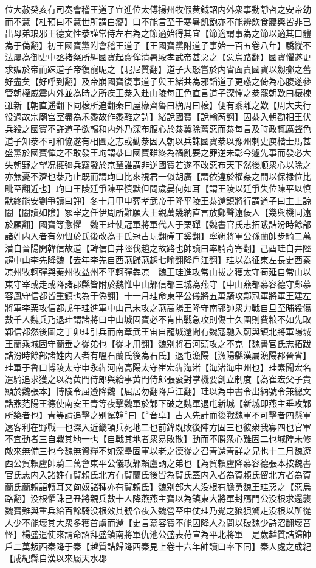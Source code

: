 位大赦癸亥有司奏會稽王道子宜進位太傅揚州牧假黄鉞詔内外衆事動靜咨之安帝幼而不慧【杜預曰不慧世所謂白癡】口不能言至于寒暑飢飽亦不能辨飲食寢興皆非已出母弟琅邪王德文性㳟謹常侍左右為之節適始得其宜【節適謂事為之節以適其口體為于偽翻】初王國寶黨附會稽王道子【王國寶黨附道子事始一百五卷八年】驕縱不法屢為御史中丞褚粲所糾國寶起齋侔清暑殿孝武帝甚惡之【惡烏路翻】國寶懼遂更求媚於帝而踈道子帝復寵昵之【昵尼質翻】道子大怒嘗於内省面責國寶以劔擲之舊好盡矣【好呼到翻】及帝崩國寶復事道子與王緒共為邪謟道子更惑之倚為心腹遂參管朝權威震内外並為時之所疾王㳟入赴山陵每正色直言道子深憚之㳟罷朝歎曰榱棟雖新【朝直遥翻下同榱所追翻秦曰屋椽齊魯曰桷周曰榱】便有黍離之歎【周大夫行役過故宗廟宫室盡為禾黍故作黍離之詩】緒說國寶【說輸芮翻】因㳟入朝勸相王伏兵殺之國寶不許道子欲輯和内外乃深布腹心於㳟冀除舊惡而㳟每言及時政輒厲聲色道子知㳟不可和恊遂有相圖之志或勸㳟因入朝以兵誅國寶㳟以豫州刺史庾楷士馬甚盛黨於國寶憚之不敢發王珣謂㳟曰國寶雖終為禍亂要之罪逆未彰今遽先事而發必大失朝野之望况擁彊兵竊發於京輦誰謂非逆國寶若遂不改惡布天下然後順衆心以除之亦無憂不濟也㳟乃止既而謂珣曰比來視君一似胡廣【謂依違於權姦之間以保禄位比毗至翻近也】珣曰王陵廷爭陳平慎默但問歲晏何如耳【謂王陵以廷爭失位陳平以慎默終能安劉爭讀曰諍】冬十月甲申葬孝武帝于隆平陵王㳟還鎮將行謂道子曰主上諒闇【闇讀如隂】冢宰之任伊周所難願大王親萬幾納直言放鄭聲遠佞人【幾與機同遠於願翻】國寶等愈懼　魏王珪使冠軍將軍代人于栗磾【魏書官氏志拓跋詰汾時餘部諸姓内入者有勿忸於氏後改為于氏冠古玩翻磾丁奚翻】寧朔將軍公孫蘭帥步騎二萬潜自晉陽開韓信故道【韓信自井陘伐趙之故路也帥讀曰率騎奇寄翻】己酉珪自井陘趨中山李先降魏【去年李先自西燕歸燕趨七喻翻降戶江翻】珪以為征東左長史西秦凉州牧軻彈與秦州牧益州不平軻彈犇凉　魏王珪進攻常山拔之獲太守苟延自常山以東守宰或走或降諸郡縣皆附於魏惟中山鄴信都三城為燕守【中山燕都慕容德守鄴慕容鳳守信都皆重鎮也為于偽翻】十一月珪命東平公儀將五萬騎攻鄴冠軍將軍王建左將軍李栗攻信都戊午珪進軍中山己未攻之燕高陽王隆守南郭帥衆力戰自旦至晡殺傷數千人魏兵乃退珪謂諸將曰中山城固寶必不肯出戰急攻則傷士久圍則費粮不如先取鄴信都然後圖之丁卯珪引兵而南章武王宙自龍城還聞有魏寇馳入薊與鎮北將軍陽城王蘭乘城固守蘭垂之從弟也【從才用翻】魏别將石河頭攻之不克【魏書官氏志拓跋詰汾時餘部諸姓内入者有嗢石蘭氏後為石氏】退屯漁陽【漁陽縣漢屬漁陽郡晉省】珪軍于魯口博陵太守申永犇河南高陽太守崔宏犇海渚【海渚海中州也】珪素聞宏名遣騎追求獲之以為黄門侍郎與給事黄門侍郎張衮對掌機要創立制度【為崔宏父子貴顯於魏張本】博陵令屈遵降魏【屈居勿翻降戶江翻】珪以為中書令出納號令兼總文誥燕范陽王德使南安王青等夜擊魏軍於鄴下破之魏軍退屯新城【新城即燕主垂攻鄴所築者也】青等請追擊之别駕韓曰【音卓】古人先計而後戰魏軍不可擊者四懸軍遠客利在野戰一也深入近畿頓兵死地二也前鋒既敗後陣方固三也彼衆我寡四也官軍不宜動者三自戰其地一也【自戰其地者衆易敗散】動而不勝衆心難固二也城隍未修敵來無備三也今魏無資糧不如深壘固軍以老之德從之召青還青詳之兄也十二月魏遼西公賀賴盧帥騎二萬會東平公儀攻鄴賴盧訥之弟也【為賀賴盧降慕容德張本按魏書官氏志内入諸姓有賀賴氏北方有賀蘭氏後皆為賀氏蓋内入者為賀賴氏留北方者為賀蘭氏蘭賴語轉耳又匈奴諸種亦有賀賴氏】魏别部大人没根有膽勇魏王珪惡之【惡烏路翻】没根懼誅己丑將親兵數十人降燕燕主寶以為鎮東大將軍封鴈門公没根求還襲魏寶難與重兵給百餘騎没根效其號令夜入魏營至中仗珪乃覺之狼狽驚走没根以所從人少不能壞其大衆多獲首虜而還【史言慕容寶不能因降人為問以破魏少詩沼翻壞音怪】楊盛遣使來請命詔拜盛鎮南將軍仇池公盛表苻宣為平北將軍　是歲越質詰歸帥戶二萬叛西秦降于秦【越質詰歸降西秦見上卷十六年帥讀曰率下同】秦人處之成紀【成紀縣自漢以來屬天水郡